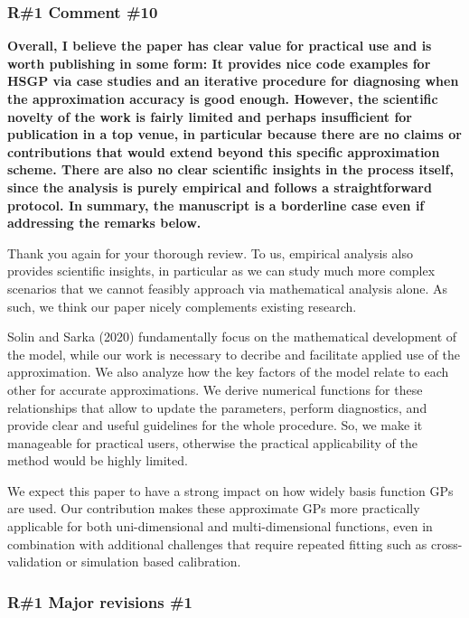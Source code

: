\documentclass[11pt]{report}
\begin{document}
\subsubsection*{R\#1 Comment \#10}

\textbf{Overall, I believe the paper has clear value for practical use and is worth publishing in some form: It provides nice code examples for HSGP via case studies and an iterative procedure for diagnosing when the approximation accuracy is good enough. However, the scientific novelty of the work is fairly limited and perhaps insufficient for publication in a top venue, in particular because there are no claims or contributions that would extend beyond this specific approximation scheme. There are also no clear scientific insights in the process itself, since the analysis is purely empirical and follows a straightforward protocol. In summary, the manuscript is a borderline case even if addressing the remarks below.}

Thank you again for your thorough review. To us, empirical analysis also provides scientific insights, in particular as we can study much more complex scenarios that we cannot feasibly approach via mathematical analysis alone. As such, we think our paper nicely complements existing research.

Solin and Sarka (2020) fundamentally focus on the mathematical development of the model, while our work is necessary to decribe and facilitate applied use of the approximation. We also analyze how the key factors of the model relate to each other for accurate approximations. We derive numerical functions for these relationships that allow to update the parameters, perform diagnostics, and provide clear and useful guidelines for the whole procedure. So, we make it manageable for practical users, otherwise the practical applicability of the method would be highly limited.

We expect this paper to have a strong impact on how widely basis function GPs are used. Our contribution makes these approximate GPs more practically applicable for both uni-dimensional and multi-dimensional functions, even in combination with additional challenges that require repeated fitting such as cross-validation or simulation based calibration.

\subsubsection*{R\#1 Major revisions \#1}
\end{document}
